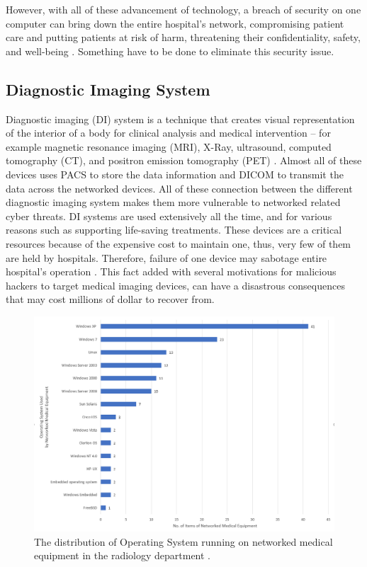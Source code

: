 \documentclass[pdf,bookmarks,colorlinks=true]{IEEEtran}
\begin{document}
However, with all of these advancement of technology, a breach of security on one computer can bring down the entire hospital's network, compromising patient care and putting patients at risk of harm, threatening their confidentiality, safety, and well-being \cite{ferrara2019cybersecurity}. Something have to be done to eliminate this security issue.

\subsection{Diagnostic Imaging System}
Diagnostic imaging (DI) system is a technique that creates visual representation of the interior of a body for clinical analysis and medical intervention -- for example magnetic resonance imaging (MRI), X-Ray, ultrasound, computed tomography (CT), and positron emission tomography (PET) \cite{InformationSecurityonDiagnosticImagingSystem}. Almost all of these devices uses PACS to store the data information and DICOM to transmit the data across the networked devices. All of these connection between the different diagnostic imaging system makes them more vulnerable to networked related cyber threats. DI systems are used extensively all the time, and for various reasons such as supporting life-saving treatments. These devices are a critical resources because of the expensive cost to maintain one, thus, very few of them are held by hospitals. Therefore, failure of one device may sabotage entire hospital's operation \cite{mahler2018know}. This fact added with several motivations for malicious hackers to target medical imaging devices, can have a disastrous consequences that may cost millions of dollar to recover from.

\begin{figure}[tph]
	\centering
	\includegraphics[width=0.7\linewidth]{OSonRadiology}
	\caption{The distribution of Operating System running on networked medical equipment in the radiology department \cite{moses2015lack}.}
	\label{fig:osonradiology}
\end{figure}
\end{document}
